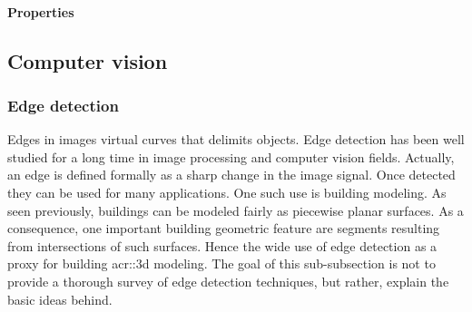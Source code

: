             \paragraph{Properties}
    \subsection{Computer vision}
        \label{subsec::state_of_the_art::mlpr::computer_vision}

        \subsubsection{Edge detection}
            Edges in images virtual curves that delimits objects.
            Edge detection has been well studied for a long time in image processing and computer vision fields.
            Actually, an edge is defined formally as a sharp change in the image signal.
            Once detected they can be used for many applications.
            One such use is building modeling.
            As seen previously, buildings can be modeled fairly as piecewise planar surfaces.
            As a consequence, one important building geometric feature are segments resulting from intersections of such surfaces.
            Hence the wide use of edge detection as a proxy for building \gls{acr::3d} modeling.
            The goal of this sub-subsection is not to provide a thorough survey of edge detection techniques, but rather, explain the basic ideas behind.\\
            
